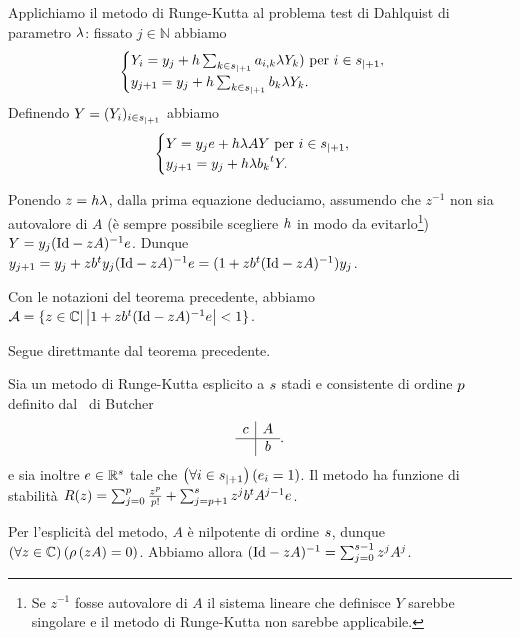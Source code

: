 \Proof Applichiamo il metodo di Runge-Kutta al problema test di Dahlquist di parametro $\lambda$: fissato $j \in \mathbb{N}$ abbiamo
\[
\begin{cases}
	Y_i = y_j + h\sum_{k \in {s}_{|+ 1}} a_{i,k}\lambda Y_k)\text{ per }i \in {s}_{|+ 1},\\
	y_{j + 1} = y_j + h\sum_{k \in {s}_{|+ 1}} b_k \lambda Y_k.
\end{cases}
\]
Definendo $Y = (Y_i)_{i \in {s}_{|+ 1}}$ abbiamo
\[
\begin{cases}
	Y = y_j e + h \lambda A Y\text{ per }i \in {s}_{|+ 1},\\
	y_{j + 1} = y_j + h \lambda {b_k}^t Y.
\end{cases}
\]
\par Ponendo $z = h \lambda$, dalla prima equazione deduciamo, assumendo che $z^{-1}$ non sia autovalore di $A$ (\`e sempre possibile scegliere $h$ in modo da evitarlo\footnote{Se $z^{-1}$ fosse autovalore di $A$ il sistema lineare che definisce $Y$ sarebbe singolare e il metodo di Runge-Kutta non sarebbe applicabile.}) $Y = y_j (\Identity - zA)^{-1}e$. Dunque $y_{j + 1} = y_j + z \Transposed{b} y_j (\Identity - zA)^{-1}e = (1 + z \Transposed{b}(\Identity - zA)^{-1}) y_j$. \EndProof
\begin{Corollary}
	Con le notazioni del teorema precedente, abbiamo $\StabilityRegion = \lbrace z \in \mathbb{C} | \AbsoluteValue{1 + z\Transposed{b}(\Identity - z A)^{-1}e} < 1 \rbrace$.
\end{Corollary}
\Proof Segue direttmante dal teorema precedente. \EndProof
\begin{Theorem}
	Sia un metodo di Runge-Kutta esplicito a $s$ stadi e consistente di ordine $p$ definito dal \tableau\ di Butcher
	\[
	\begin{array}{c|c}
		c	&	A\\
		\hline
			&	b
	\end{array}.
	\]
	e sia inoltre $e \in \mathbb{R}^s$ tale che $\left ( \forall i \in {s}_{|+ 1} \right ) \left ( e_i = 1 \right )$.
	Il metodo ha funzione di stabilit\`a $R(z) = \sum_{j = 0}^p \frac{z^p}{p !} + \sum_{j = p + 1}^s z^j {b}^t A^{j - 1} e$.
\end{Theorem}
\Proof Per l'esplicit\`a del metodo, $A$ \`e nilpotente di ordine $s$, dunque $\left ( \forall z \in \mathbb{C} \right ) \left ( \rho \left ( zA \right ) = 0 \right )$. Abbiamo allora $(\Identity - z A)^{-1} = \sum_{j = 0}^{\StagesNumber - 1} z^jA^j$.
